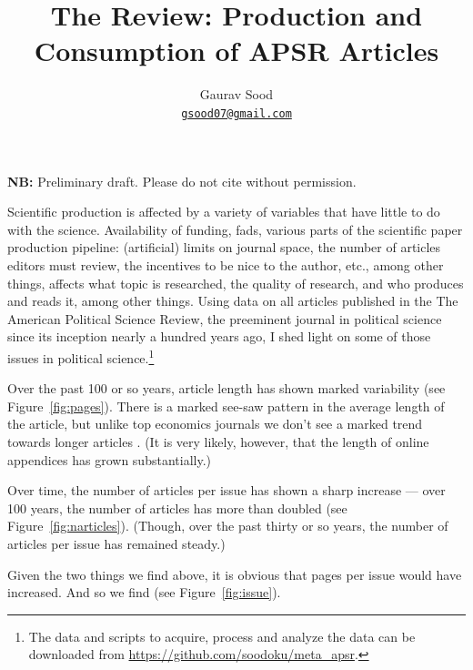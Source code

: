 \documentclass[11pt]{article}
\begin{document}
\title{\vspace{-1cm}\normalsize{\textbf{The Review: Production and Consumption of APSR Articles}}}
\author{Gaurav Sood\\\small{\href{mailto:gsood07@gmail.com}{\tt{gsood07@gmail.com}}}}
\maketitle
\begin{center}
\vspace{-.5cm}\textbf{NB:} Preliminary draft. Please do not cite without permission.
\end{center}
\vspace{.2cm}
\doublespacing

Scientific production is affected by a variety of variables that have little to do with the science. Availability of funding, fads, various parts of the scientific paper production pipeline: (artificial) limits on journal space, the number of articles editors must review, the incentives to be nice to the author, etc., among other things, affects what topic is researched, the quality of research, and who produces and reads it, among other things. Using data on all articles published in the The American Political Science Review, the preeminent journal in political science since its inception nearly a hundred years ago, I shed light on some of those issues in political science.\footnote{The data and scripts to acquire, process and analyze the data can be downloaded from \href{https://github.com/soodoku/meta_apsr}{https://github.com/soodoku/meta\_apsr}.} 

Over the past 100 or so years, article length has shown marked variability (see Figure~\ref{fig:pages}). There is a marked see-saw pattern in the average length of the article, but unlike top economics journals we don't see a marked trend towards longer articles \citep{card2013nine, card2014page}. (It is very likely, however, that the length of online appendices has grown substantially.)

Over time, the number of articles per issue has shown a sharp increase --- over 100 years, the number of articles has more than doubled (see Figure~\ref{fig:narticles}). (Though, over the past thirty or so years, the number of articles per issue has remained steady.) 

Given the two things we find above, it is obvious that pages per issue would have increased. And so we find (see Figure~\ref{fig:issue}). 
\end{document}
